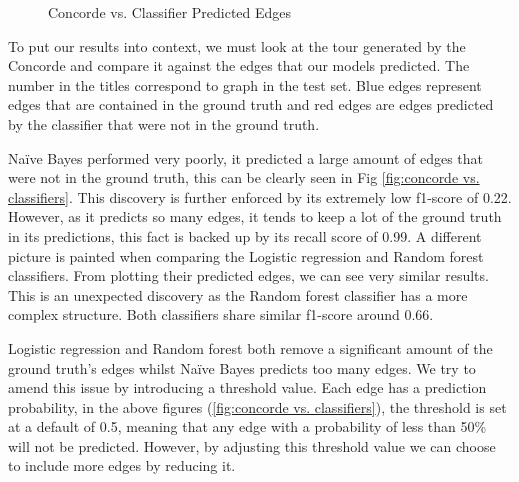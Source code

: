 \documentclass[]{UCD_CS_FYP_Report}
\begin{document}
\begin{figure}[!h]
   \hfill
  \caption{Concorde vs. Classifier Predicted Edges}
\end{figure}\label{fig:concorde vs. classifiers}

To put our results into context, we must look at the tour generated by the Concorde and compare it against the edges that our models predicted. The number in the titles correspond to graph in the test set. Blue edges represent edges that are contained in the ground truth and red edges are edges predicted by the classifier that were not in the ground truth.

Naïve Bayes performed very poorly, it predicted a large amount of edges that were not in the ground truth, this can be clearly seen in Fig \ref{fig:concorde vs. classifiers}. This discovery is further enforced by its extremely low f1-score of 0.22. However, as it predicts so many edges, it tends to keep a lot of the ground truth in its predictions, this fact is backed up by its recall score of 0.99. A different picture is painted when comparing the Logistic regression and Random forest classifiers. From plotting their predicted edges, we can see very similar results. This is an unexpected discovery as the Random forest classifier has a more complex structure. Both classifiers share similar f1-score around 0.66.

Logistic regression and Random forest both remove a significant amount of the ground truth’s edges whilst Naïve Bayes predicts too many edges. We try to amend this issue by introducing a threshold value. Each edge has a prediction probability, in the above figures (\ref{fig:concorde vs. classifiers}), the threshold is set at a default of 0.5, meaning that any edge with a probability of less than 50\% will not be predicted. However, by adjusting this threshold value we can choose to include more edges by reducing it.
\end{document}
